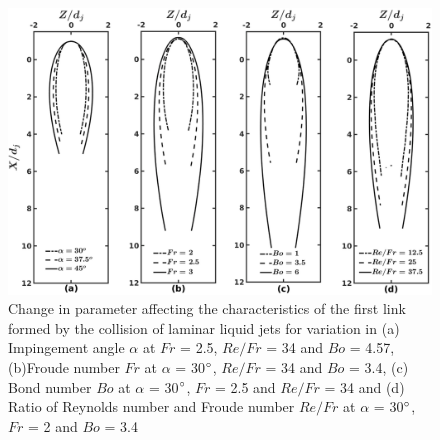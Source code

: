 \documentclass[%
aip,
sd,%
amsmath,amssymb,
preprint,%
author-year,%
]{revtex4-1}
\begin{document}
\begin{figure}
	\centering
	\includegraphics[width=\linewidth]{finalContour}
	\caption{Change in parameter affecting the characteristics of the first link formed by the collision of laminar liquid jets for variation in (a) Impingement angle $\alpha$ at $Fr$ = 2.5, $Re/Fr$ = 34 and $Bo$ = 4.57, (b)Froude number $Fr$ at $\alpha$ = 30$\degree$, $Re/Fr$ = 34 and $Bo$ = 3.4, (c) Bond number $Bo$ at $\alpha$ = 30$\degree$, $Fr$ = 2.5 and $Re/Fr$ = 34 and (d) Ratio of Reynolds number and Froude number $Re/Fr$ at $\alpha$ = 30$\degree$, $Fr$ = 2 and $Bo$ = 3.4}
	\label{Figure::finalContours}
\end{figure}
\end{document}
